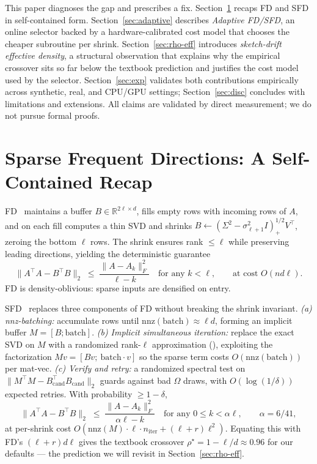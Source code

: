 \documentclass[11pt]{article}
\begin{document}
This paper diagnoses the gap and prescribes a fix. Section~\ref{sec:sfd}
recaps FD and SFD in self-contained form. Section~\ref{sec:adaptive} describes
\emph{Adaptive FD/SFD}, an online selector backed by a hardware-calibrated cost
model that chooses the cheaper subroutine per shrink. Section~\ref{sec:rho-eff}
introduces \emph{sketch-drift effective density}, a structural observation that
explains why the empirical crossover sits so far below the textbook prediction
and justifies the cost model used by the selector. Section~\ref{sec:exp}
validates both contributions empirically across synthetic, real, and CPU/GPU
settings; Section~\ref{sec:disc} concludes with limitations and extensions.
All claims are validated by direct measurement; we do not pursue formal proofs.

\section{Sparse Frequent Directions: A Self-Contained Recap}
\label{sec:sfd}

FD~\cite{liberty2013fd} maintains a buffer $B \in \mathbb{R}^{2\ell \times d}$,
fills empty rows with incoming rows of $A$, and on each fill computes a thin
SVD and shrinks $B \leftarrow (\Sigma^2 - \sigma_{\ell+1}^2 I)_{+}^{1/2} V^\top$,
zeroing the bottom $\ell$ rows. The shrink ensures rank $\le \ell$ while
preserving leading directions, yielding the deterministic guarantee
\begin{equation}
\label{eq:fd-bound}
  \|A^\top A - B^\top B\|_2 \;\le\; \frac{\|A - A_k\|_F^2}{\ell - k}
  \quad\text{for any } k < \ell,
  \qquad\text{at cost } O(nd\ell).
\end{equation}
FD is density-oblivious: sparse inputs are densified on entry.

SFD~\cite{ghashami2016sfd} replaces three components of FD without breaking the
shrink invariant. \emph{(a) nnz-batching:} accumulate rows until
$\mathrm{nnz}(\mathrm{batch}) \approx \ell d$, forming an implicit buffer
$M = [B;\mathrm{batch}]$. \emph{(b) Implicit simultaneous iteration:} replace
the exact SVD on $M$ with a randomized rank-$\ell$ approximation
(\cite{halko2011randomsvd}), exploiting the factorization
$M v = [Bv;\ \mathrm{batch}\cdot v]$ so the sparse term costs
$O(\mathrm{nnz}(\mathrm{batch}))$ per mat-vec. \emph{(c) Verify and retry:} a
randomized spectral test on $\|M^\top M - B_{\mathrm{cand}}^\top B_{\mathrm{cand}}\|_2$
guards against bad $\Omega$ draws, with $O(\log(1/\delta))$ expected retries.
With probability $\ge 1{-}\delta$,
\begin{equation}
\label{eq:sfd-bound}
  \|A^\top A - B^\top B\|_2 \;\le\; \frac{\|A - A_k\|_F^2}{\alpha\ell - k}
  \quad\text{for any } 0 \le k < \alpha\ell,
  \qquad \alpha = 6/41,
\end{equation}
at per-shrink cost $O(\mathrm{nnz}(M) \cdot \ell \cdot n_{\mathrm{iter}} + (\ell+r)\ell^2)$.
Equating this with FD's $(\ell+r)d\ell$ gives the textbook crossover
$\rho^\star = 1 - \ell/d \approx 0.96$ for our defaults --- the prediction we
will revisit in Section~\ref{sec:rho-eff}.
\end{document}
